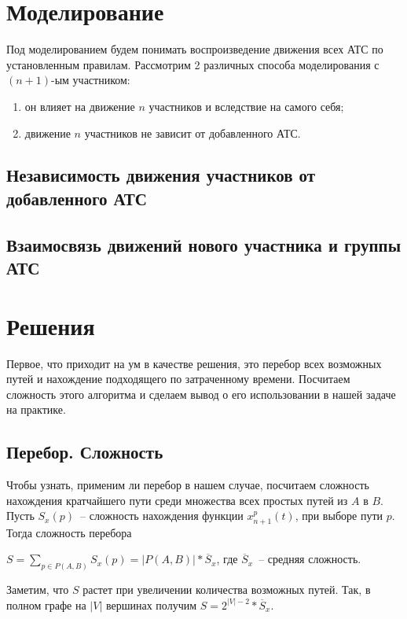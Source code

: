 \documentclass[12pt, a4paper]{article}
\begin{document}
\newpage
\section{Моделирование}

Под моделированием будем понимать воспроизведение движения всех АТС по установленным правилам. Рассмотрим 2 различных способа моделирования с $(n+1)$-ым участником: 
\begin{enumerate}
	\item он влияет на движение $n$ участников и вследствие на самого себя;
	\item движение $n$ участников не зависит от добавленного АТС.
\end{enumerate}

\subsection{Независимость движения участников от добавленного АТС}
\subsection{Взаимосвязь движений нового участника и группы АТС}

\newpage
\section{Решения}

Первое, что приходит на ум в качестве решения, это перебор всех возможных путей и нахождение подходящего по затраченному времени. Посчитаем сложность этого алгоритма и сделаем вывод о его использовании в нашей задаче на практике.

\subsection{Перебор. Сложность}
Чтобы узнать, применим ли перебор в нашем случае, посчитаем сложность нахождения кратчайшего пути среди множества всех простых путей из $A$ в $B$. Пусть $S_x(p)$~-- сложность нахождения функции $x^p_{n+1}(t)$, при выборе пути $p$. Тогда сложность перебора
\begin{center}
 $S = \sum\limits_{p \in P(A,B)} S_x(p) = \vert P(A,B) \vert * \overline S_x$, где $\overline S_x$~-- средняя сложность.
\end{center}
Заметим, что $ S $ растет при увеличении количества возможных путей. Так, в полном графе на $\vert V \vert$ вершинах получим $S = 2^{|V|-2} * \overline S_x$.
\end{document}
